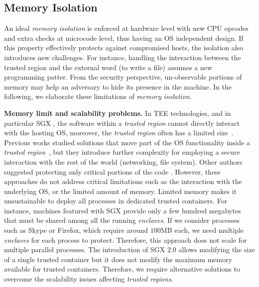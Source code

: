\subsection{Memory Isolation}

An ideal \emph{memory isolation} is enforced at hardware level with new CPU 
opcodes and extra checks at microcode level, thus having an OS independent 
design.
If this property effectively protects against compromised hosts, the isolation 
also introduces new challenges.
For instance, handling the interaction between the trusted region and 
the external word (\eg to write a file) assumes a new programming patter.
From the security perspective, un-observable portions of memory may help an 
adversary to hide its presence in the machine.
In the following, we elaborate these limitations of \emph{memory isolation}.

\vspace{0.5cm}
\noindent \textbf{Memory limit and scalability problems.}
In TEE technologies, and in particular SGX \citep{costan2016intel}, the 
software within a \emph{trusted region} cannot directly interact with the 
hosting OS, moreover, the \emph{trusted region} often has a limited 
size~\citep{baumann2015shielding}.
Previous works studied solutions that move part of the OS functionality inside 
a \emph{trusted 
region}~\citep{baumann2015shielding,arnautov2016scone,tsai2017graphene},
but they introduce further complexity for employing a secure interaction with 
the rest of the world (\eg networking, file system).
Other authors suggested protecting only critical portions of the 
code \citep{schuster2015vc3,lind2017glamdring}.
However, these approaches do not address critical limitations such as the 
interaction with the underlying OS, or the limited amount of memory.
Limited memory makes it unsustainable to deploy all processes in dedicated 
trusted containers.
For instance, machines featured with SGX provide only a few hundred megabytes 
that must be shared among all the running \emph{enclaves}.
If we consider processes such as Skype or Firefox, which require around 
$100$MB each, we need multiple \emph{enclaves} for each process to protect.
Therefore, this approach does not scale for multiple parallel processes.
The introduction of SGX $2.0$ allows modifying the size of a single trusted 
container but it does not modify the maximum memory available for trusted 
containers.
Therefore, we require alternative solutions to overcome the scalability issues 
affecting \emph{trusted regions}.

